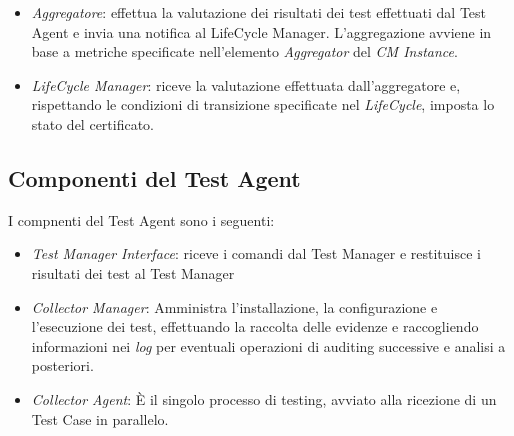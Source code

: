 \documentclass[../main.tex]{subfiles}
\begin{document}
\begin{itemize}
\item \textit{Aggregatore}: effettua la valutazione dei risultati dei test effettuati dal Test Agent e invia una notifica al LifeCycle Manager. L'aggregazione avviene in base a metriche specificate nell'elemento \textit{Aggregator} del \textit{CM Instance}.
\item \textit{LifeCycle Manager}: riceve la valutazione effettuata dall'aggregatore e, rispettando le condizioni di transizione specificate nel \textit{LifeCycle}, imposta lo stato del certificato.
\end{itemize}
\subsection{Componenti del Test Agent}
I compnenti del Test Agent sono i seguenti:
\begin{itemize}
\item \textit{Test Manager Interface}: riceve i comandi dal Test Manager e
restituisce i risultati dei test al Test Manager
\item \textit{Collector Manager}: Amministra l'installazione, la configurazione e l'esecuzione dei test, effettuando la raccolta delle evidenze e raccogliendo informazioni nei \textit{log} per eventuali operazioni di auditing successive e analisi a posteriori.
\item \textit{Collector Agent}: \`E il singolo processo di testing, avviato alla ricezione di un Test Case in parallelo.
\end{itemize}
\end{document}
